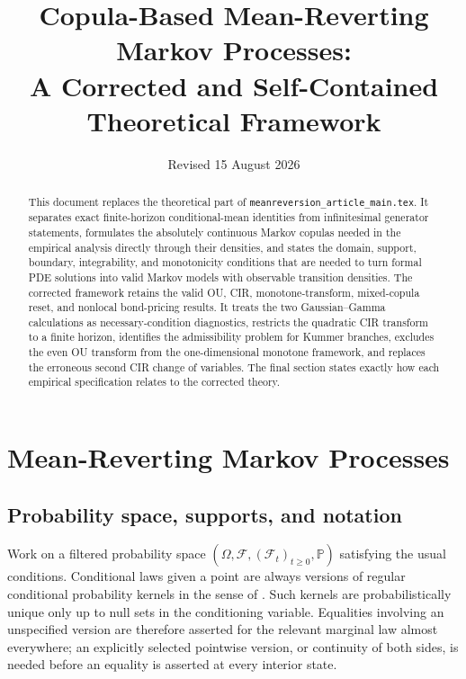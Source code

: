 \documentclass[11pt]{article}
\title{Copula-Based Mean-Reverting Markov Processes:\\A Corrected and Self-Contained Theoretical Framework}
\author{}
\date{Revised 15 August 2026}
\theoremstyle{remark}
\newcommand{\Pp}{\mathbb P}
\begin{document}
\maketitle

\begin{abstract}
This document replaces the theoretical part of
\texttt{meanreversion\_article\_main.tex}.  It separates exact finite-horizon
conditional-mean identities from infinitesimal generator statements, formulates
the absolutely continuous Markov copulas needed in the empirical analysis
directly through their densities, and states the domain,
support, boundary, integrability, and monotonicity conditions that are needed to
turn formal PDE solutions into valid Markov models with observable transition
densities.  The corrected framework retains the valid OU, CIR, monotone-transform,
mixed-copula reset, and nonlocal bond-pricing results.  It treats the two
Gaussian--Gamma calculations as necessary-condition diagnostics, restricts the
quadratic CIR transform to a finite horizon, identifies the admissibility problem
for Kummer branches, excludes the even OU transform from the one-dimensional
monotone framework, and replaces the erroneous second CIR change of variables.
The final section states exactly how each empirical specification relates to the
corrected theory.
\end{abstract}

\fi
\section{Mean-Reverting Markov Processes}
\label{sec:mean-reverting-markov}

\subsection{Probability space, supports, and notation}

Work on a filtered probability space
$(\Omega,\mathcal F,(\mathcal F_t)_{t\ge0},\Pp)$ satisfying the usual
conditions.  Conditional laws given a point are always versions of regular
conditional probability kernels in the sense of
\citet[Chapter~8]{Kallenberg2021}.  Such kernels are probabilistically unique
only up to null sets in the conditioning variable.  Equalities involving an
unspecified version are therefore asserted for the relevant marginal law almost
everywhere; an explicitly selected pointwise version, or continuity of both
sides, is needed before an equality is asserted at every interior state.
\end{document}
